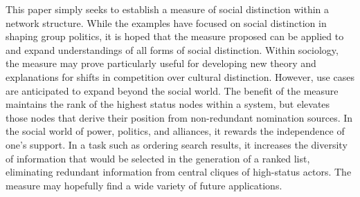 \documentclass[12pt]{article}
\begin{document}
This paper simply seeks to establish a measure of social distinction within a network structure. While the examples have focused on social distinction in shaping group politics, it is hoped that the measure proposed can be applied to and expand understandings of all forms of social distinction. Within sociology, the measure may prove particularly useful for developing new theory and explanations for shifts in competition over cultural distinction. However, use cases are anticipated to expand beyond the social world. The benefit of the measure maintains the rank of the highest status nodes within a system, but elevates those nodes that derive their position from non-redundant nomination sources. In the social world of power, politics, and alliances, it rewards the independence of one's support. In a task such as ordering search results, it increases the diversity of information that would be selected in the generation of a ranked list, eliminating redundant information from central cliques of high-status actors. The measure may hopefully find a wide variety of future applications. 


\newpage


\newpage




\newpage
\end{document}
